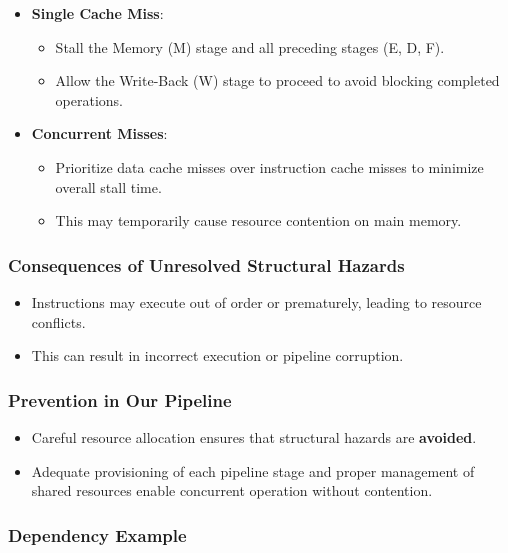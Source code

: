 \begin{itemize}
    \item \textbf{Single Cache Miss}:
        \begin{itemize}
            \item Stall the Memory (M) stage and all preceding stages (E, D, F).
            \item Allow the Write-Back (W) stage to proceed to avoid blocking completed operations.
        \end{itemize}
    \item \textbf{Concurrent Misses}:
        \begin{itemize}
            \item Prioritize data cache misses over instruction cache misses to minimize overall stall time.
            \item This may temporarily cause resource contention on main memory.
        \end{itemize}
\end{itemize}

\subsubsection{Consequences of Unresolved Structural Hazards}

\begin{itemize}
    \item Instructions may execute out of order or prematurely, leading to resource conflicts.
    \item This can result in incorrect execution or pipeline corruption.
\end{itemize}

\subsubsection{Prevention in Our Pipeline}

\begin{itemize}
    \item Careful resource allocation ensures that structural hazards are \textbf{avoided}.
    \item Adequate provisioning of each pipeline stage and proper management of shared resources enable concurrent operation without contention.
\end{itemize}

\subsubsection{Dependency Example}

